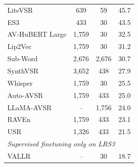 \begin{table}[h]
\begin{tabular}{l c c c}
LiteVSR \cite{laux2023litevsrefficientvisualspeech}                & 639       & 59    & 45.7 \\
ES3 \cite{Zhang_2024_CVPR}                    & 433       & 30    & 43.5 \\
AV-HuBERT Large \cite{shi2022learningaudiovisualspeechrepresentation}        & 1{,}759   & 30    & 32.5 \\
Lip2Vec \cite{djilali2023lip2vecefficientrobustvisual}               & 1{,}759   & 30    & 31.2 \\
Sub-Word \cite{prajwal2021subwordlevellipreading}               & 2{,}676   & 2{,}676 & 30.7 \\
SynthVSR \cite{liu2023synthvsrscalingvisualspeech}                & 3{,}652   & 438   & 27.9 \\
Whisper \cite{prajwal24_interspeech}                & 1{,}759   & 30    & 25.5 \\
Auto-AVSR \cite{Ma_2023}              & 1{,}759   & 433   & 25.0 \\
LLaMA-AVSR \cite{cappellazzo2025largelanguagemodelsstrong}              & --        & 1{,}756 & 24.0 \\
RAVEn \cite{haliassos2023jointlylearningvisualauditory}                  & 1{,}759   & 433   & 23.1 \\
USR \cite{haliassos2024unifiedspeechrecognitionsingle}                    & 1{,}326   & 433   & 21.5 \\
\midrule
\multicolumn{4}{l}{\textit{Supervised finetuning only on LRS3}} \\
\midrule
VALLR \cite{thomas2026vallrvisualasrlanguage}             & --      & 30      & 18.7 \\
\bottomrule
\end{tabular}
\end{table}


